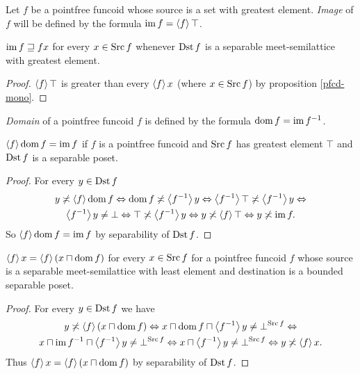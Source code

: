 \begin{defn}
Let $f$ be a pointfree funcoid whose
source is a set with greatest element. \emph{Image} of $f$ will be
defined by the formula $\operatorname{im} f=\left\langle f\right\rangle\top$.\end{defn}
\begin{obvious}
$\operatorname{im} f\sqsupseteq fx$ for every $x\in\operatorname{Src} f$ whenever $\operatorname{Dst} f$
is a separable meet-semilattice with greatest element.\end{obvious}
\begin{proof}
$\left\langle f\right\rangle\top$ is greater than every $\left\langle f\right\rangle x$ (where $x\in\operatorname{Src} f$)
by proposition \ref{pfcd-mono}.\end{proof}
\begin{defn}
\emph{Domain} of a pointfree funcoid
$f$ is defined by the formula $\operatorname{dom} f=\operatorname{im} f^{-1}$.\end{defn}
\begin{prop}
$\left\langle f\right\rangle\operatorname{dom} f=\operatorname{im} f$ if $f$ is a pointfree funcoid and $\operatorname{Src} f$
has greatest element $\top$ and $\operatorname{Dst} f$ is a separable poset.\end{prop}
\begin{proof}
For every $y\in\operatorname{Dst} f$
\begin{multline*}
y\not\asymp\left\langle f\right\rangle\operatorname{dom} f\Leftrightarrow\operatorname{dom} f\not\asymp\left\langle f^{-1}\right\rangle y\Leftrightarrow\left\langle f^{-1}\right\rangle\top\not\asymp\left\langle f^{-1}\right\rangle y\Leftrightarrow\\
\left\langle f^{-1}\right\rangle y\ne\bot\Leftrightarrow\top\not\asymp\left\langle f^{-1}\right\rangle y\Leftrightarrow y\not\asymp\left\langle f\right\rangle\top\Leftrightarrow y\not\asymp\operatorname{im} f.
\end{multline*}
So $\left\langle f\right\rangle\operatorname{dom} f=\operatorname{im} f$ by separability of $\operatorname{Dst} f$.\end{proof}
\begin{prop}
$\left\langle f\right\rangle x=\left\langle f\right\rangle(x\sqcap\operatorname{dom} f)$
for every $x\in\operatorname{Src} f$ for a pointfree funcoid $f$ whose source
is a separable meet-semilattice with least element and destination is a bounded separable poset.\end{prop}
\begin{proof}
For every $y\in\operatorname{Dst} f$ we have
\begin{multline*}
y\not\asymp\left\langle f\right\rangle(x\sqcap\operatorname{dom} f)\Leftrightarrow x\sqcap\operatorname{dom} f\sqcap\left\langle f^{-1}\right\rangle y\ne\bot^{\operatorname{Src} f}\Leftrightarrow\\
x\sqcap\operatorname{im} f^{-1}\sqcap\left\langle f^{-1}\right\rangle y\ne\bot^{\operatorname{Src} f}\Leftrightarrow x\sqcap\left\langle f^{-1}\right\rangle y\ne\bot^{\operatorname{Src} f}\Leftrightarrow y\not\asymp\left\langle f\right\rangle x.
\end{multline*}
Thus $\left\langle f\right\rangle x=\left\langle f\right\rangle(x\sqcap\operatorname{dom} f)$ by separability of $\operatorname{Dst} f$.\end{proof}
